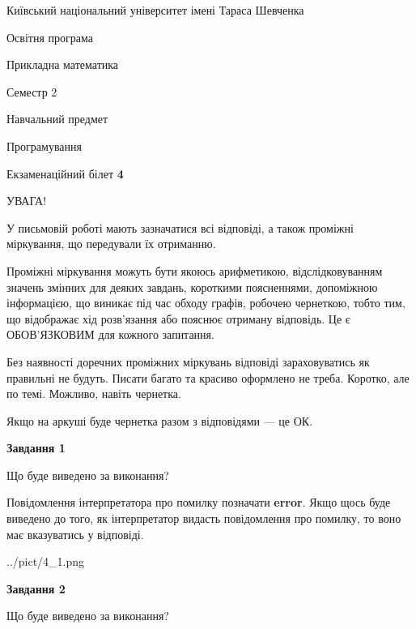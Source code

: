 \documentclass[12pt, ukrainian]{article}
\begin{document}
{{\begin {small}\par
{ \center  Київський національний університет імені Тараса Шевченка \par}
{\parbox {5 cm}{Освітня програма \hfill}{\parbox {7 cm}{Прикладна математика \hfill}}\parbox {6 cm}{\hfill Семестр 2}}\par
{\parbox {5 cm} {Навчальний предмет \hfill}\parbox {7 cm}{Програмування \hfill}\parbox {6cm}{\hfill}\par}\vspace{-7pt} \end{small}}{\center Екзаменаційний білет \No \textbf
{ 4 }\par}}
{
\begin {large}
УВАГА!

У письмовій роботі мають зазначатися всі відповіді, а також проміжні міркування, що передували їх отриманню.

Проміжні міркування можуть бути якоюсь арифметикою, відслідковуванням зна\-чень змінних для деяких завдань,
короткими поясненнями, допоміжною інформацією, що виникає під час обходу графів, робочею чернеткою,
тобто тим, що відображає хід розв’язання або пояснює отриману відповідь.
Це є ОБОВ’ЯЗКОВИМ для кожного запитання.

Без наявності доречних проміжних міркувань відповіді зараховуватись як правиль\-ні не будуть.
Писати багато та красиво оформлено не треба. Коротко, але по темі. Можли\-во, навіть чернетка.

Якщо на аркуші буде чернетка разом з відповідями --- це ОК.

\newpage

{\begin {center}\textbf{Завдання 1}\end {center}}\par
Що буде виведено за виконання?

Повідомлення інтерпретатора про помилку позначати \textbf{error}.
Якщо щось буде виведено до того, як інтерпретатор видасть повідомлення про помилку, 
то воно має вказуватись у відповіді. \par


\begin{center}
	{../pict/4_1.png}
\end{center}
\newpage

{\begin {center}\textbf{Завдання 2}\end {center}}\par
Що буде виведено за виконання?


\end{large}}
\end{document}
